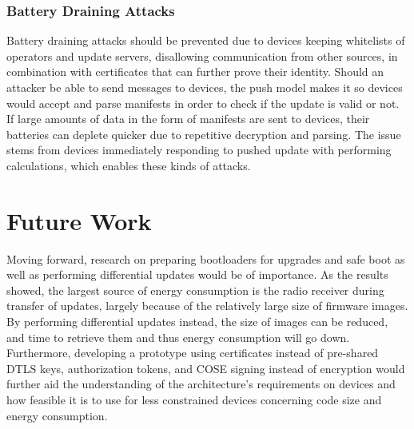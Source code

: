 \documentclass[0-thesis.tex]{subfiles}
\begin{document}
\subsubsection{Battery Draining Attacks}
Battery draining attacks should be prevented due to devices keeping whitelists of
operators and update servers, disallowing communication from other sources, in combination
with certificates that can further prove their identity. Should an attacker be able to
send messages to devices, the push model makes it so devices would accept and parse
manifests in order to check if the update is valid or not. If large amounts of data in the
form of manifests are sent to devices, their batteries can deplete quicker due to
repetitive decryption and parsing. The issue stems from devices immediately responding to
pushed update with performing calculations, which enables these kinds of attacks.


\section{Future Work}
\label{sec:future-work}
Moving forward, research on preparing bootloaders for upgrades and safe boot as well as
performing differential updates would be of importance. As the results showed, the largest
source of energy consumption is the radio receiver during transfer of updates, largely
because of the relatively large size of firmware images. By performing differential
updates instead, the size of images can be reduced, and time to retrieve them and thus
energy consumption will go down. Furthermore, developing a prototype using certificates
instead of pre-shared DTLS keys, authorization tokens, and COSE signing instead of
encryption would further aid the understanding of the architecture's requirements on
devices and how feasible it is to use for less constrained devices concerning code size
and energy consumption. 
\end{document}
